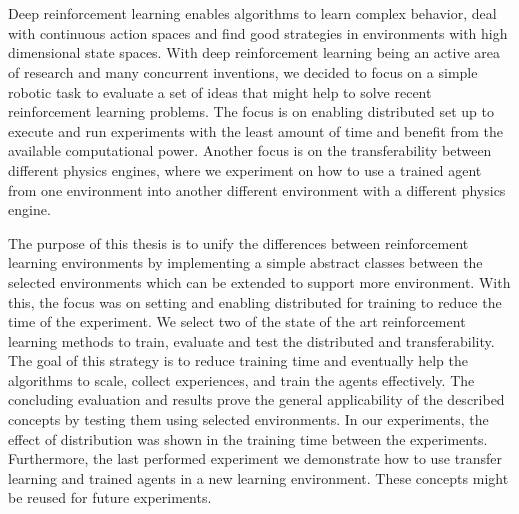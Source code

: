 \chapter{\abstractname}
Deep reinforcement learning enables algorithms to learn complex behavior, deal with continuous action spaces and find good strategies in environments with high dimensional state spaces. With deep reinforcement learning being an active area of research and many concurrent inventions, we decided to focus on a simple robotic task to evaluate a set of ideas that might help to solve recent reinforcement learning problems. The focus is on enabling distributed set up to execute and run experiments with the least amount of time and benefit from the available computational power. Another focus is on the transferability between different physics engines, where we experiment on how to use a trained agent from one environment into another different environment with a different physics engine.

The purpose of this thesis is to unify the differences between reinforcement learning environments by implementing a simple abstract classes between the selected environments which can be extended to support more environment. With this, the focus was on setting and enabling distributed for training to reduce the time of the experiment. We select two of the state of the art reinforcement learning methods to train, evaluate and test the distributed and transferability. The goal of this strategy is to reduce training time and eventually help the algorithms to scale, collect experiences, and train the agents effectively. The concluding evaluation and results prove the general applicability of the described concepts by testing them using selected environments. In our experiments, the effect of distribution was shown in the training time between the experiments. Furthermore, the last performed experiment we demonstrate how to use transfer learning and trained agents in a new learning environment. These concepts might be reused for future experiments.